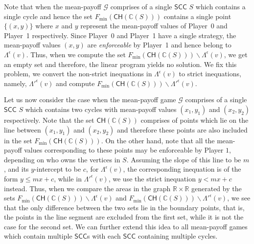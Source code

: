 Note that when the mean-payoff $\mathcal{G}$ comprises of a single $\mathsf{SCC}$ $S$ which contains a single cycle and hence the set $F_{\min}(\mathsf{CH}(\mathbb{C}(S)))$ contains a single point $\{(x, y)\}$ where $x$ and $y$ represent the mean-payoff values of Player~0 and Player~1 respectively. 
Since Player~0 and Player~1 have a single strategy, the mean-payoff values $(x,y)$  are \textit{enforceable} by Player~1 and hence belong to $\Lambda^{\epsilon}(v)$. Thus, when we compute the set $F_{\min}(\mathsf{CH}(\mathbb{C}(S))) \backslash \Lambda^{\epsilon}(v)$, we get an empty set and therefore, the linear program yields no solution. We fix this problem, we convert the non-strict inequations in $\Lambda^{\epsilon}(v)$ to strict inequations, namely, $\Lambda'^{\epsilon}(v)$ and compute $F_{\min}(\mathsf{CH}(\mathbb{C}(S))) \backslash \Lambda'^{\epsilon}(v)$. 

Let us now consider the case when the mean-payoff game $\mathcal{G}$ comprises of a single $\mathsf{SCC}$ $S$ which contains two cycles with mean-payoff values $(x_1, y_1)$ and $(x_2, y_2)$ respectively. Note that the set $\mathsf{CH}(\mathbb{C}(S))$ comprises of points which lie on the line between $(x_1, y_1)$ and $(x_2, y_2)$ and therefore 
these points are also included in the set $F_{\min}(\mathsf{CH}(\mathbb{C}(S)))$.
On the other hand, note that all the mean-payoff values corresponding to these points may be enforceable by Player $1$, depending on who owns the vertices in $S$.
Assuming the slope of this line to be $m$, and its $y$-intercept to be $c$, for $\Lambda^{\epsilon}(v)$, the corresponding inequation is of the form $y \leqslant mx+c$, while in $\Lambda'^{\epsilon}(v)$, we use the strict inequation $y < mx+c$ instead.
Thus, when we compare the areas in the graph $\mathbb{R} \times \mathbb{R}$ generated by the sets $F_{\min}(\mathsf{CH}(\mathbb{C}(S))) \backslash \Lambda^{\epsilon}(v)$ and $F_{\min}(\mathsf{CH}(\mathbb{C}(S))) \backslash \Lambda'^{\epsilon}(v)$, we see that the only difference between the two sets lie in the boundary points, that is, the points in the line segment are excluded from the first set, while it is not the case for the second set.
We can further extend this idea to all mean-payoff games which contain multiple $\mathsf{SCC}$s with each $\mathsf{SCC}$ containing multiple cycles.

